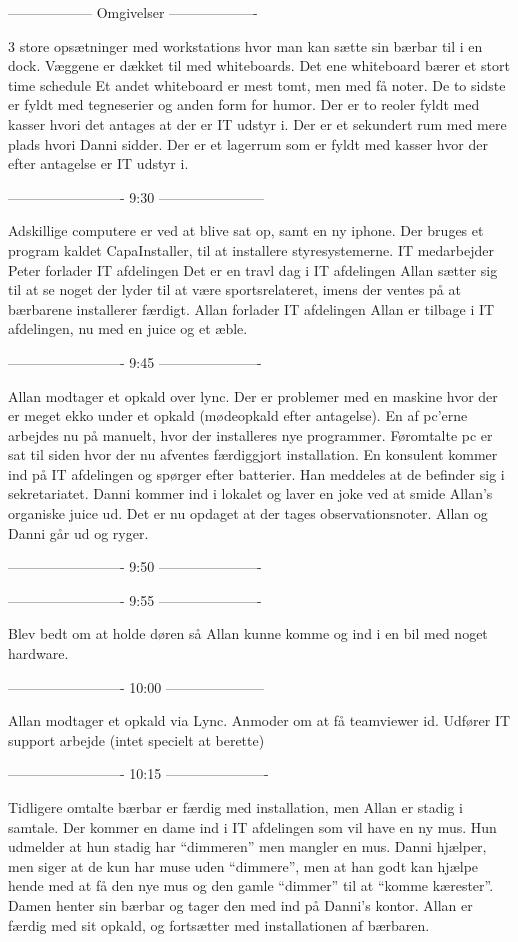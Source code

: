 ------------------ Omgivelser -------------------

3 store opsætninger med workstations hvor man kan sætte sin bærbar til i en dock.
Væggene er dækket til med whiteboards.
Det ene whiteboard bærer et stort time schedule
Et andet whiteboard er mest tomt, men med få noter.
De to sidste er fyldt med tegneserier og anden form for humor.
Der er to reoler fyldt med kasser hvori det antages at der er IT udstyr i.
Der er et sekundert rum med mere plads hvori Danni sidder.
Der er et lagerrum som er fyldt med kasser hvor der efter antagelse er IT udstyr i.

------------------------- 9:30 -----------------------

Adskillige computere er ved at blive sat op, samt en ny iphone.
Der bruges et program kaldet CapaInstaller, til at installere styresystemerne.
IT medarbejder Peter forlader IT afdelingen
Det er en travl dag i IT afdelingen
Allan sætter sig til at se noget der lyder til at være sportsrelateret, imens der ventes på at bærbarene installerer færdigt.
Allan forlader IT afdelingen
Allan er tilbage i IT afdelingen, nu med en juice og et æble.

------------------------- 9:45 ----------------------

Allan modtager et opkald over lync.
Der er problemer med en maskine hvor der er meget ekko under et opkald (mødeopkald efter antagelse).
En af pc’erne arbejdes nu på manuelt, hvor der installeres nye programmer.
Føromtalte pc er sat til siden hvor der nu afventes færdiggjort installation.
En konsulent kommer ind på IT afdelingen og spørger efter batterier.
Han meddeles at de befinder sig i sekretariatet.
Danni kommer ind i lokalet og laver en joke ved at smide Allan’s organiske juice ud.
Det er nu opdaget at der tages observationsnoter.
Allan og Danni går ud og ryger.

------------------------- 9:50 ----------------------

------------------------- 9:55 ----------------------

Blev bedt om at holde døren så Allan kunne komme og ind i en bil med noget hardware.

------------------------- 10:00 ---------------------

Allan modtager et opkald via Lync.
Anmoder om at få teamviewer id.
Udfører IT support arbejde (intet specielt at berette)

------------------------- 10:15 ----------------------

Tidligere omtalte bærbar er færdig med installation, men Allan er stadig i samtale.
Der kommer en dame ind i IT afdelingen som vil have en ny mus.
Hun udmelder at hun stadig har “dimmeren” men mangler en mus.
Danni hjælper, men siger at de kun har muse uden “dimmere”, men at han godt kan hjælpe hende med at få den nye mus og den gamle “dimmer” til at “komme kærester”.
Damen henter sin bærbar og tager den med ind på Danni’s kontor.
Allan er færdig med sit opkald, og fortsætter med installationen af bærbaren.

